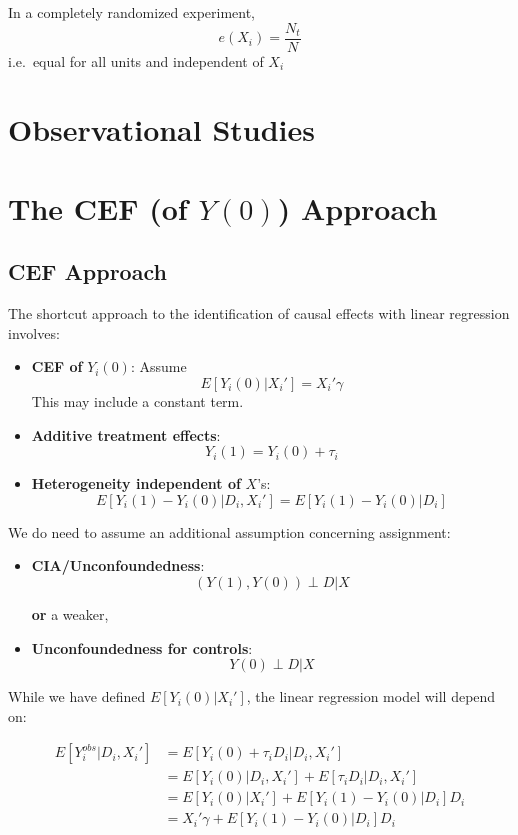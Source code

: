 \documentclass[
  letterpaper,
  DIV=11,
  numbers=noendperiod]{scrreprt}
\theoremstyle{definition}
\theoremstyle{remark}
\begin{document}
In a completely randomized experiment, \[
e(X_i)=\frac{N_t}{N}
\] i.e.~equal for all units and independent of \(X_i\)

\chapter{Observational Studies}\label{observational-studies-1}

\chapter{\texorpdfstring{The CEF (of \(Y(0)\))
Approach}{The CEF (of Y(0)) Approach}}\label{the-cef-of-y0-approach-1}

\section{CEF Approach}\label{cef-approach-1}

The shortcut approach to the identification of causal effects with
linear regression involves:

\begin{itemize}
\item
  \textbf{CEF of} \(Y_i(0)\): Assume \[
  E[Y_i(0)|X_i'] = X_i'\gamma
  \] This may include a constant term.
\item
  \textbf{Additive treatment effects}: \[
  Y_i(1) = Y_i(0) + \tau_i
  \]
\item
  \textbf{Heterogeneity independent of} \(X\)'s: \[
  E[Y_i(1) - Y_i(0)|D_i,X_i'] = E[Y_i(1) - Y_i(0)|D_i]
  \]
\end{itemize}

We do need to assume an additional assumption concerning assignment:

\begin{itemize}
\item
  \textbf{CIA/Unconfoundedness}: \[
  (Y(1),Y(0)) \perp D | X
  \]

  \textbf{or} a weaker,
\item
  \textbf{Unconfoundedness for controls}: \[
  Y(0) \perp D | X
  \]
\end{itemize}

While we have defined \(E[Y_i(0)|X_i']\), the linear regression model
will depend on:

\[
\begin{aligned}
E[Y^{obs}_i|D_i,X_i'] &= E[Y_i(0)+\tau_iD_i|D_i,X_i'] \\
                      &= E[Y_i(0)|D_i,X_i']+E[\tau_iD_i|D_i,X_i'] \\
                      &= E[Y_i(0)|X_i']+E[Y_i(1)-Y_i(0)|D_i]D_i \\
                      &= X_i'\gamma + E[Y_i(1)-Y_i(0)|D_i]D_i
\end{aligned}
\]
\end{document}
